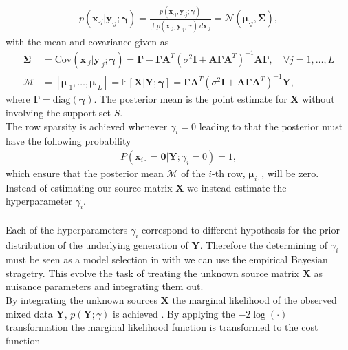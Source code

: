 \begin{align*}
p(\mathbf{x}_{\cdot j} \vert \mathbf{y}_{\cdot j} ; \boldsymbol{\gamma}) = \frac{p(\mathbf{x}_{\cdot j}, \mathbf{y}_{\cdot j} ; \boldsymbol{\gamma})}{\int p(\mathbf{x}_{\cdot j}, \mathbf{y}_{\cdot j} ; \boldsymbol{\gamma}) \ d \mathbf{x}_{\cdot j}} = \mathcal{N}(\boldsymbol{\mu}_{\cdot j}, \boldsymbol{\Sigma}),
\end{align*}
with the mean and covariance given as
\begin{align}\label{eq:moments}
\boldsymbol{\Sigma} &= \text{Cov}(\mathbf{x}_{\cdot j} \vert \mathbf{y}_{\cdot j} ; \boldsymbol{\gamma}) = \boldsymbol{\Gamma} - \boldsymbol{\Gamma} \mathbf{A}^T \left( \sigma^2 \mathbf{I} + \mathbf{A} \boldsymbol{\Gamma} \mathbf{A}^T\right)^{-1} \mathbf{A} \boldsymbol{\Gamma}, \quad \forall j = 1, \dots, L \\
\mathcal{M} &= [\boldsymbol{\mu}_{\cdot 1}, \dots, \boldsymbol{\mu}_{\cdot L}] = \mathbb{E}[\mathbf{X} \vert \mathbf{Y} ; \boldsymbol{\gamma}] = \boldsymbol{\Gamma} \mathbf{A}^T \left( \sigma^2 \mathbf{I} + \mathbf{A} \boldsymbol{\Gamma} \mathbf{A}^T\right)^{-1} \mathbf{Y},
\end{align}
where $\boldsymbol{\Gamma} = \text{diag}(\boldsymbol{\gamma})$. The posterior mean is the point estimate for $\mathbf{X}$ without involving the support set $S$.
\\
The row sparsity is achieved whenever $\gamma_i = 0$ leading to that the posterior must have the following probability
\begin{align*}
P(\mathbf{x}_{i \cdot} = \mathbf{0} \vert \mathbf{Y} ; \gamma_i = 0) = 1,
\end{align*}
which ensure that the posterior mean $\mathcal{M}$ of the $i$-th row, $\boldsymbol{\mu}_{i \cdot}$, will be zero. Instead of estimating our source matrix $\mathbf{X}$ we instead estimate the hyperparameter $\gamma_i$.
\\ \\
Each of the hyperparameters $\gamma_i$ correspond to different hypothesis for the prior distribution of the underlying generation of $\mathbf{Y}$. Therefore the determining of $\gamma_i$ must be seen as a model selection in with we can use the empirical Bayesian stragetry. This evolve the task of treating the unknown source matrix $\mathbf{X}$ as nuisance parameters and integrating them out.
\\
By integrating the unknown sources $\mathbf{X}$ the marginal likelihood of the observed mixed data $\mathbf{Y}$, $p (\mathbf{Y} ; \gamma)$ is achieved \cite[p. 146]{??}. By applying the $-2 \log (\cdot)$ transformation the marginal likelihood function is transformed to the cost function
